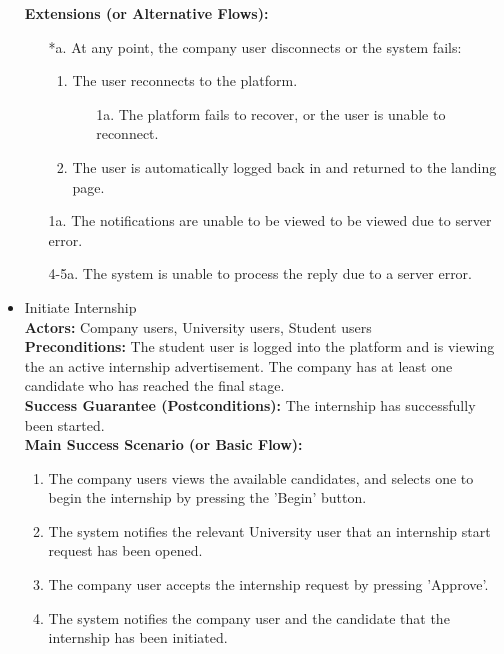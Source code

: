 \begin{itemize}[label={[\textbf{UC}]}, align=left, leftmargin=*]
    \textbf{Extensions (or Alternative Flows):} 
    \begin{enumerate}[label=\arabic*.]
        \item[*a.] At any point, the company user disconnects or the system fails:
            \begin{enumerate}[label=\arabic*.]
                \item The user reconnects to the platform.
                    \begin{enumerate}[label=\alph*.]
                        \item[1a.] The platform fails to recover, or the user is unable to reconnect.
                    \end{enumerate}
                 \item The user is automatically logged back in and returned to the landing page.
            \end{enumerate}
        \item[1a.] The notifications are unable to be viewed to be viewed due to server error.
        \item[4-5a.] The system is unable to process the reply due to a server error. 
        \end{enumerate}


        
    \item {} Initiate Internship \\
    \textbf{Actors:} Company users, University users, Student users\\
     \textbf{Preconditions:} The student user is logged into the platform and is viewing the an active internship advertisement. The company has at least one candidate who has reached the final stage.\\
     \textbf{Success Guarantee (Postconditions):} The internship has successfully been started. \\
     \textbf{Main Success Scenario (or Basic Flow):} 
     \begin{enumerate}[label=\arabic*.] 
        \item The company users views the available candidates, and selects one to begin the internship by pressing the 'Begin' button.
        \item The system notifies the relevant University user that an internship start request has been opened.
        \item The company user accepts the internship request by pressing 'Approve'.
        \item The system notifies the company user and the candidate that the internship has been initiated.
     \end{enumerate} \\


\end{itemize}
